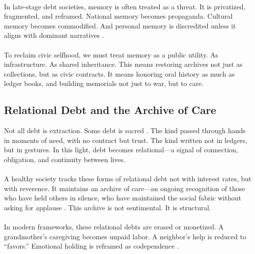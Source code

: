 \documentclass[12pt]{article}
\begin{document}
\paragraph{}In late-stage debt societies, memory is often treated as a threat. It is privatized, fragmented, and reframed. National memory becomes propaganda. Cultural memory becomes commodified. And personal memory is discredited unless it aligns with dominant narratives \cite{hooks1990yearning}.

\paragraph{}To reclaim civic selfhood, we must treat memory as a public utility. As infrastructure. As shared inheritance. This means restoring archives not just as collections, but as civic contracts. It means honoring oral history as much as ledger books, and building memorials not just to war, but to care.

\subsection{Relational Debt and the Archive of Care}

Not all debt is extraction. Some debt is sacred \cite{hooks1990yearning}. The kind passed through hands in moments of need, with no contract but trust. The kind written not in ledgers, but in gestures. In this light, debt becomes relational—a signal of connection, obligation, and continuity between lives.

\paragraph{}A healthy society tracks these forms of relational debt not with interest rates, but with reverence. It maintains an archive of care—an ongoing recognition of those who have held others in silence, who have maintained the social fabric without asking for applause \cite{ahmed2004cultural}. This archive is not sentimental. It is structural.

\paragraph{}In modern frameworks, these relational debts are erased or monetized. A grandmother's caregiving becomes unpaid labor. A neighbor's help is reduced to “favors.” Emotional holding is reframed as codependence \cite{hooks1990yearning}.
\end{document}
